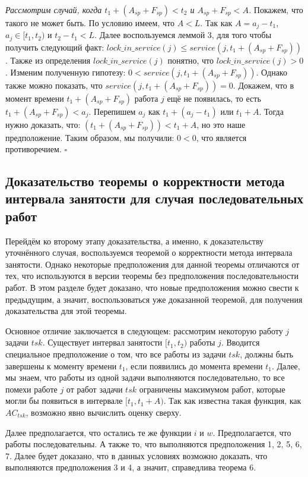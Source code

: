\documentclass[14pt]{matmex-diploma-custom}
\begin{document}
\textit{Рассмотрим случай, когда $t_1 + (A_{sp} + F_{sp}) < t_2$ и $A_{sp} + F_{sp} < A$.} 
    Покажем, что такого не может быть. 
    По условию имеем, что $A < L$. Так как $A = a_j - t_1$, $a_j \in [t_1, t_2)$ и $t_2 - t_1 < L$.
    Далее воспользуемся леммой 3, для того чтобы получить следующий факт: 
      $lock\_in\_service(j) \leq service(j, t_1 + (A_{sp} + F_{sp}))$.
    Также из определения $lock\_in\_service (j)$ понятно, что $lock\_in\_service( j) > 0$. Изменим 
      полученную гипотезу: $0 < service(j, t_1 + (A_{sp} + F_{sp}))$.
    Однако также можно показать, что $service(j, t_1 + (A_{sp} + F_{sp})) = 0$. Докажем, что 
      в момент времени $t_1 + (A_{sp} + F_{sp})$ работа $j$ ещё не появилась, то есть $t_1 + (A_{sp} + F_{sp}) < a_j$. 
    Перепишем $a_j$ как $t_1 + (a_j - t_1)$ или $t_1 + A$. 
    Тогда нужно доказать, что: $(t_1 + (A_{sp} + F_{sp})) < t_1 + A$, но это наше предположение. 
    Таким образом, мы получили: $0 < 0$, что является противоречием.
 $\square$

\subsection{Доказательство теоремы о корректности метода интервала занятости для случая последовательных работ}
    
Перейдём ко второму этапу доказательства, а именно, к доказательству уточнённого случая, 
  воспользуемся теоремой о корректности метода интервала занятости. Однако 
  некоторые предположения для данной теоремы отличаются от тех, что используются
  в версии теоремы без предположения последовательности работ. В этом разделе будет доказано, 
  что новые предположения можно свести к предыдущим, а значит, воспользоваться уже доказанной теоремой, 
  для получения доказательства для этой теоремы.

Основное отличие заключается в следующем: рассмотрим некоторую работу $j$ задачи $tsk$. 
  Существует интервал занятости $[t_1,t_2)$ работы $j$. Вводится специальное предположение о том, 
  что все работы из задачи $tsk$, должны быть завершены к моменту времени $t_1$, если 
  появились до момента времени $t_1$. Далее, мы знаем, что работы из одной задачи 
  выполняются последовательно, то все помехи работе $j$ от работ задачи $tsk$ 
  ограничены максимумом работ, которые могли бы появиться в интервале $[t_1, t_1 + A)$. 
  Так как известна такая функция, как $AC_{tsk}$, возможно явно вычислить оценку сверху. 
  
Далее предполагается, что остались те же функции $i$ и $w$. Предполагается, что работы последовательны.
  А также то, что выполняются предположения 1, 2, 5, 6, 7. Далее будет доказано, 
  что в данных условиях возможно доказать, что выполняются предположения 3 и 4, 
  а значит, справедлива теорема 6.
\end{document}
